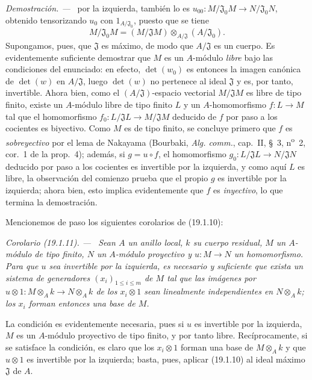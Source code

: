 \documentclass[10pt,oneside]{book}
\makeatletter
\newcommand{\setmanualcurrentlabel}[1]{\def\@currentlabel{#1}}
\newenvironment{corollary}[1][]{%
  \setmanualcurrentlabel{#1}\par\medskip\noindent\itshape Corolario (#1). ---\ }{\par}
\newenvironment{proof}{%
  \par\medskip\noindent\textit{Demostración. ---\ }}{\par}
\makeatother
\begin{document}
\begin{proof}
por la izquierda, también lo es
$u_{00}:M/\mathfrak J_0M\to N/\mathfrak J_0N$, obtenido tensorizando $u_0$ con
$1_{A/\mathfrak J_0}$, puesto que se tiene
\[
  M/\mathfrak J_0M=(M/\mathfrak JM)\otimes_{A/\mathfrak J}(A/\mathfrak J_0).
\]
Supongamos, pues, que $\mathfrak J$ es máximo, de modo que $A/\mathfrak J$ es
un cuerpo. Es evidentemente suficiente demostrar que $M$ es un $A$-módulo
\emph{libre} bajo las condiciones del enunciado: en efecto, $\det(w_0)$ es
entonces la imagen canónica de $\det(w)$ en $A/\mathfrak J$, luego $\det(w)$
no pertenece al ideal $\mathfrak J$ y es, por tanto, invertible. Ahora bien,
como el $(A/\mathfrak J)$-espacio vectorial $M/\mathfrak JM$ es libre de tipo
finito, existe un $A$-módulo libre de tipo finito $L$ y un $A$-homomorfismo $f:L\to M$
tal que el homomorfismo $f_0:L/\mathfrak JL\to M/\mathfrak JM$ deducido de $f$
por paso a los cocientes es biyectivo. Como $M$ es de tipo finito, se concluye
primero que $f$ es \emph{sobreyectivo} por el lema de Nakayama (Bourbaki,
\emph{Alg. comm.}, cap.~II, §~3, n\textsuperscript{o}~2, cor.~1 de la
prop.~4); además, si $g=u\circ f$, el homomorfismo
$g_0:L/\mathfrak JL\to N/\mathfrak JN$ deducido por paso a los cocientes es
invertible por la izquierda, y como aquí $L$ es libre, la observación del
comienzo prueba que el propio $g$ es invertible por la izquierda; ahora bien,
esto implica evidentemente que $f$ es \emph{inyectivo}, lo que termina la demostración.
\end{proof}

Mencionemos de paso los siguientes corolarios de (19.1.10):

\begin{corollary}[19.1.11]
\label{0.19.1.11-es}
Sean $A$ un anillo local, $k$ su cuerpo residual, $M$ un $A$-módulo de tipo
finito, $N$ un $A$-módulo proyectivo y $u:M\to N$ un homomorfismo. Para que
$u$ sea invertible por la izquierda, es necesario y suficiente que exista un
sistema de generadores $(x_i)_{1\leq i\leq m}$ de $M$ tal que las imágenes por
$u\otimes 1:M\otimes_Ak\to N\otimes_Ak$ de los $x_i\otimes1$ sean linealmente
independientes en $N\otimes_Ak$; los $x_i$ forman entonces una base de $M$.
\end{corollary}

La condición es evidentemente necesaria, pues si $u$ es invertible por la
izquierda, $M$ es un $A$-módulo proyectivo de tipo finito, y por tanto libre.
Recíprocamente, si se satisface la condición, es claro que los $x_i\otimes1$
forman una base de $M\otimes_Ak$ y que $u\otimes1$ es invertible por la
izquierda; basta, pues, aplicar (19.1.10) al ideal máximo $\mathfrak J$ de $A$.
\end{document}
